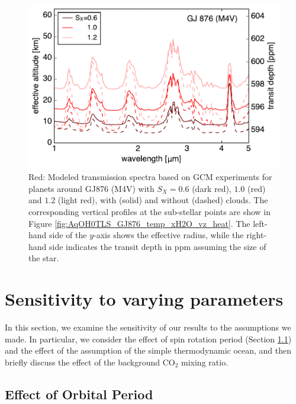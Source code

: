 \documentclass[11pt,numberedappendix,twocolappendix,]{emulateapj}
\begin{document}
\begin{figure}[!h]
    \begin{center}
    \includegraphics[width=\hsize]{fig/transit_GJ876.pdf}
    \end{center}
\caption{Red: Modeled transmission spectra based on GCM experiments for planets around GJ876 (M4V) with $S_X=0.6$ (dark red), $1.0$ (red) and $1.2$ (light red), with (solid) and without (dashed) clouds. The corresponding vertical profiles at the sub-stellar points are show in Figure \ref{fig:AqOH0TLS_GJ876_temp_xH2O_vz_heat}. The left-hand side of the $y$-axis shows the effective radius, while the right-hand side indicates the transit depth in ppm assuming the size of the star. }
\label{fig:transmission}
\end{figure}


\section{Sensitivity to varying parameters}
\label{s:sensitivity}

In this section, we examine the sensitivity of our results to the  assumptions we made. 
In particular, we consider the effect of spin rotation period (Section \ref{ss:sensitivity_Porbit}) and the effect of the assumption of the simple thermodynamic ocean, and then briefly discuss the effect of the background CO$_2$ mixing ratio. 


\subsection{Effect of Orbital Period}
\label{ss:sensitivity_Porbit}
\end{document}
